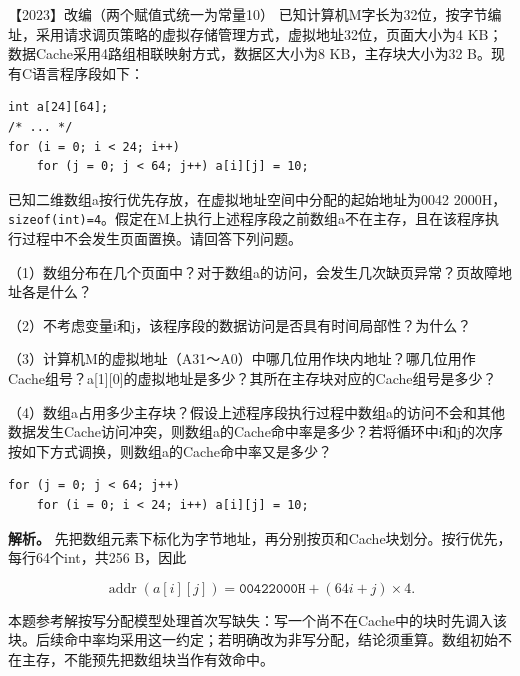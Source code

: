 \noindent{}【2023】改编（两个赋值式统一为常量10） 已知计算机M字长为32位，按字节编址，采用请求调页策略的虚拟存储管理方式，虚拟地址32位，页面大小为4 KB；数据Cache采用4路组相联映射方式，数据区大小为8 KB，主存块大小为32 B。现有C语言程序段如下：

\par\medskip\noindent
\begin{minipage}{\linewidth}
\begin{verbatim}
int a[24][64];
/* ... */
for (i = 0; i < 24; i++)
    for (j = 0; j < 64; j++) a[i][j] = 10;
\end{verbatim}
\end{minipage}\par\medskip

已知二维数组a按行优先存放，在虚拟地址空间中分配的起始地址为0042 2000H，\texttt{sizeof(int)=4}。假定在M上执行上述程序段之前数组a不在主存，且在该程序执行过程中不会发生页面置换。请回答下列问题。

（1）数组分布在几个页面中？对于数组a的访问，会发生几次缺页异常？页故障地址各是什么？

（2）不考虑变量i和j，该程序段的数据访问是否具有时间局部性？为什么？

（3）计算机M的虚拟地址（A31～A0）中哪几位用作块内地址？哪几位用作Cache组号？a{[}1{]}{[}0{]}的虚拟地址是多少？其所在主存块对应的Cache组号是多少？

（4）数组a占用多少主存块？假设上述程序段执行过程中数组a的访问不会和其他数据发生Cache访问冲突，则数组a的Cache命中率是多少？若将循环中i和j的次序按如下方式调换，则数组a的Cache命中率又是多少？

\par\medskip\noindent
\begin{minipage}{\linewidth}
\begin{verbatim}
for (j = 0; j < 64; j++)
    for (i = 0; i < 24; i++) a[i][j] = 10;
\end{verbatim}
\end{minipage}\par\medskip


\textbf{解析。} 先把数组元素下标化为字节地址，再分别按页和Cache块划分。按行优先，每行64个int，共256 B，因此

\[
\operatorname{addr}(a[i][j])=\mathtt{00422000H}+(64i+j)\times4.
\]

本题参考解按写分配模型处理首次写缺失：写一个尚不在Cache中的块时先调入该块。后续命中率均采用这一约定；若明确改为非写分配，结论须重算。数组初始不在主存，不能预先把数组块当作有效命中。

